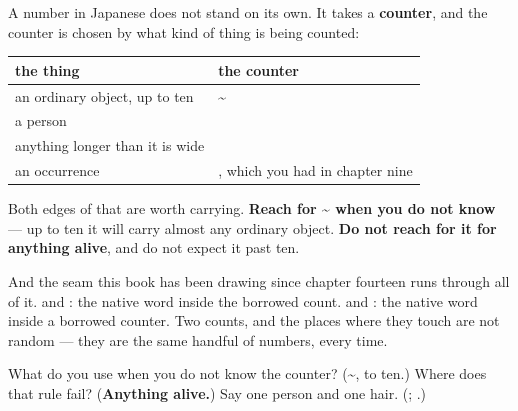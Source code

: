 \begin{grammarlens}[title={What you've built this chapter}]
A number in Japanese does not stand on its own. It takes a \textbf{counter}, and the counter is chosen by what kind of thing is being counted:

\noindent
\begin{tabularx}{\linewidth}{@{}>{\raggedright\arraybackslash}X>{\raggedright\arraybackslash}X@{}}
\toprule
\textbf{the thing} & \textbf{the counter} \\
\midrule
an ordinary object, up to ten & \textbf{\textasciitilde{}\ja{つ}} \\
a person & \textbf{\ja{にん}} \\
anything longer than it is wide & \textbf{\ja{ほん}} \\
an occurrence & \textbf{\ja{ど}}, which you had in chapter nine \\
\bottomrule
\end{tabularx}

Both edges of that are worth carrying. \textbf{Reach for \textasciitilde{} when you do not know} — up to ten it will carry almost any ordinary object. \textbf{Do not reach for it for anything alive}, and do not expect it past ten.

And the seam this book has been drawing since chapter fourteen runs through all of it. \textbf{} and \textbf{}: the native word inside the borrowed count. \textbf{} and \textbf{}: the native word inside a borrowed counter. Two counts, and the places where they touch are not random — they are the same handful of numbers, every time.
\end{grammarlens}

\begin{tcolorbox}[breakable,colback=teal!4,colframe=teal!35!black,title={Before you move on}]
What do you use when you do not know the counter? (\textbf{\textasciitilde{}}, to ten.) Where does that rule fail? (\textbf{Anything alive.}) Say one person and one hair. (\textbf{}; \textbf{ }.)
\end{tcolorbox}
